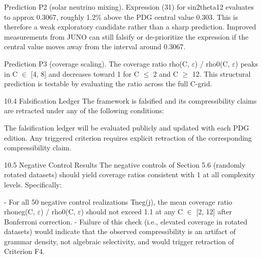   Prediction P2 (solar neutrino mixing). Expression (31) for sin2theta12 evaluates to
  approx 0.3067, roughly 1.2\% above the PDG central value 0.303. This is therefore a
  weak exploratory candidate rather than a sharp prediction. Improved measurements
  from JUNO can still falsify or de-prioritize the expression if the central value moves
  away from the interval around 0.3067.

  Prediction P3 (coverage scaling). The coverage ratio rho(C, $\varepsilon$) / rho0(C, $\varepsilon$) peaks in C $\in$
  [4, 8] and decreases toward 1 for C $\leq$ 2 and C $\geq$ 12. This structural prediction is
  testable by evaluating the ratio across the full C-grid.

  10.4 Falsification Ledger
  The framework is falsified and its compressibility claims are retracted under any of the
  following conditions:

  The falsification ledger will be evaluated publicly and updated with each PDG edition.
  Any triggered criterion requires explicit retraction of the corresponding compressibility
  claim.

  10.5 Negative Control Results
  The negative controls of Section 5.6 (randomly rotated datasets) should yield coverage
  ratios consistent with 1 at all complexity levels. Specifically:

  - For all 50 negative control realizations Tneg(j), the mean coverage ratio rhoneg(C, $\varepsilon$) /
  rho0(C, $\varepsilon$) should not exceed 1.1 at any C $\in$ [2, 12] after Bonferroni correction.
  - Failure of this check (i.e., elevated coverage in rotated datasets) would indicate that
  the observed compressibility is an artifact of grammar density, not algebraic selectivity,
  and would trigger retraction of Criterion F4.

